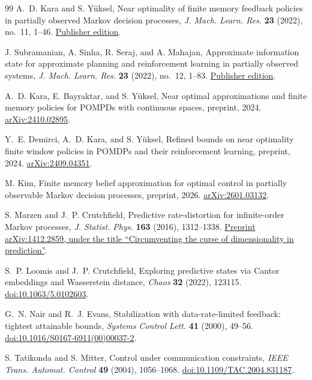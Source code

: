 \begin{thebibliography}{99}
A.~D. Kara and S. Y\"uksel, Near optimality of finite memory feedback
policies in partially observed Markov decision processes,
\emph{J. Mach. Learn. Res.} \textbf{23} (2022), no.~11, 1--46.
\href{https://www.jmlr.org/papers/v23/20-1152.html}{Publisher edition}.

J. Subramanian, A. Sinha, R. Seraj, and A. Mahajan,
Approximate information state for approximate planning and reinforcement
learning in partially observed systems,
\emph{J. Mach. Learn. Res.} \textbf{23} (2022), no.~12, 1--83.
\href{https://www.jmlr.org/papers/v23/20-1165.html}{Publisher edition}.

A.~D. Kara, E. Bayraktar, and S. Y\"uksel,
Near optimal approximations and finite memory policies for POMPDs with
continuous spaces, preprint, 2024.
\href{https://arxiv.org/abs/2410.02895}{arXiv:2410.02895}.

Y.~E. Demirci, A.~D. Kara, and S. Y\"uksel,
Refined bounds on near optimality finite window policies in POMDPs and
their reinforcement learning, preprint, 2024.
\href{https://arxiv.org/abs/2409.04351}{arXiv:2409.04351}.

M. Kim, Finite memory belief approximation for optimal control in partially
observable Markov decision processes, preprint, 2026.
\href{https://arxiv.org/abs/2601.03132}{arXiv:2601.03132}.

S. Marzen and J.~P. Crutchfield, Predictive rate-distortion for
infinite-order Markov processes, \emph{J. Statist. Phys.} \textbf{163}
(2016), 1312--1338.
\href{https://arxiv.org/abs/1412.2859}{Preprint arXiv:1412.2859,
under the title ``Circumventing the curse of dimensionality in prediction''}.

S.~P. Loomis and J.~P. Crutchfield, Exploring predictive states via Cantor
embeddings and Wasserstein distance, \emph{Chaos} \textbf{32} (2022), 123115.
\href{https://doi.org/10.1063/5.0102603}{doi:10.1063/5.0102603}.

G.~N. Nair and R.~J. Evans, Stabilization with data-rate-limited
feedback: tightest attainable bounds, \emph{Systems Control Lett.}
\textbf{41} (2000), 49--56.
\href{https://doi.org/10.1016/S0167-6911(00)00037-2}{doi:10.1016/S0167-6911(00)00037-2}.

S. Tatikonda and S. Mitter, Control under communication constraints,
\emph{IEEE Trans. Automat. Control} \textbf{49} (2004), 1056--1068.
\href{https://doi.org/10.1109/TAC.2004.831187}{doi:10.1109/TAC.2004.831187}.


\end{thebibliography}
